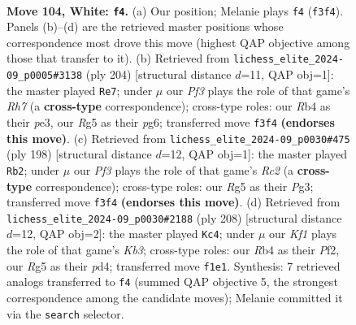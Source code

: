 \documentclass[11pt]{article}
\begin{document}
\clearpage

\begin{figure}[p]\centering
\begin{subfigure}{0.46\textwidth}\centering
\resizebox{\linewidth}{!}{%
\newchessgame
\chessboard[
  setfen={r7/3k4/4p3/6R1/1R2P3/5P2/8/5K2 w - - 11 104},
  showmover=false,
  pgfstyle=straightmove, color=movearrow, markmove={f3-f4}
]}
\caption{}
\end{subfigure}\hfill
\begin{subfigure}{0.46\textwidth}\centering
\resizebox{\linewidth}{!}{%
\newchessgame
\chessboard[
  setfen={8/7R/6pP/3k2P1/8/4p1K1/8/5r2 w - - 0 103},
  showmover=false,
  pgfstyle=straightmove, color=movearrow, markmove={h7-e7}
]}
\caption{}
\end{subfigure}
\\[4pt]
\begin{subfigure}{0.46\textwidth}\centering
\resizebox{\linewidth}{!}{%
\newchessgame
\chessboard[
  setfen={8/6k1/8/7p/7P/6P1/2R3K1/r7 w - - 45 100},
  showmover=false,
  pgfstyle=straightmove, color=movearrow, markmove={c2-b2}
]}
\caption{}
\end{subfigure}\hfill
\begin{subfigure}{0.46\textwidth}\centering
\resizebox{\linewidth}{!}{%
\newchessgame
\chessboard[
  setfen={5R2/8/1k6/2p5/3p4/1K3P2/5P2/r7 w - - 2 105},
  showmover=false,
  pgfstyle=straightmove, color=movearrow, markmove={b3-c4}
]}
\caption{}
\end{subfigure}
\caption{\textbf{Move 104, White: \texttt{f4}.} (a) Our position; Melanie plays \texttt{f4} (\texttt{f3f4}). Panels (b)--(d) are the retrieved master positions whose correspondence most drove this move (highest QAP objective among those that transfer to it). (b) Retrieved from \texttt{lichess\_elite\_2024-09\_p0005\#3138} (ply 204) [structural distance $d$=11, QAP obj=1]: the master played \texttt{Re7}; under $\mu$ our \emph{Pf3} plays the role of that game's \emph{Rh7} (a \textbf{cross-type} correspondence); cross-type roles: our \emph{R}b4 as their \emph{p}e3, our \emph{R}g5 as their \emph{p}g6; transferred move \texttt{f3f4} \textbf{(endorses this move)}. (c) Retrieved from \texttt{lichess\_elite\_2024-09\_p0030\#475} (ply 198) [structural distance $d$=12, QAP obj=1]: the master played \texttt{Rb2}; under $\mu$ our \emph{Pf3} plays the role of that game's \emph{Rc2} (a \textbf{cross-type} correspondence); cross-type roles: our \emph{R}g5 as their \emph{P}g3; transferred move \texttt{f3f4} \textbf{(endorses this move)}. (d) Retrieved from \texttt{lichess\_elite\_2024-09\_p0030\#2188} (ply 208) [structural distance $d$=12, QAP obj=2]: the master played \texttt{Kc4}; under $\mu$ our \emph{Kf1} plays the role of that game's \emph{Kb3}; cross-type roles: our \emph{R}b4 as their \emph{P}f2, our \emph{R}g5 as their \emph{p}d4; transferred move \texttt{f1e1}. Synthesis: 7 retrieved analogs transferred to \texttt{f4} (summed QAP objective 5, the strongest correspondence among the candidate moves); Melanie committed it via the \texttt{search} selector.}
\label{fig:thought-m206}
\end{figure}
\end{document}
